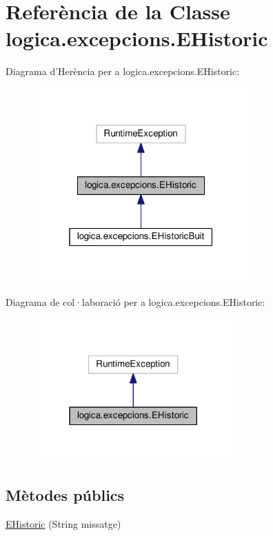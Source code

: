 \hypertarget{classlogica_1_1excepcions_1_1_e_historic}{\section{Referència de la Classe logica.\+excepcions.\+E\+Historic}
\label{classlogica_1_1excepcions_1_1_e_historic}
}


Diagrama d'Herència per a logica.\+excepcions.\+E\+Historic\+:
\nopagebreak
\begin{figure}[H]
\begin{center}
\leavevmode
\includegraphics[width=235pt]{classlogica_1_1excepcions_1_1_e_historic__inherit__graph}
\end{center}
\end{figure}


Diagrama de col·laboració per a logica.\+excepcions.\+E\+Historic\+:
\nopagebreak
\begin{figure}[H]
\begin{center}
\leavevmode
\includegraphics[width=218pt]{classlogica_1_1excepcions_1_1_e_historic__coll__graph}
\end{center}
\end{figure}
\subsection*{Mètodes públics}
\begin{DoxyCompactItemize}
\item 
\hyperlink{classlogica_1_1excepcions_1_1_e_historic_acab5c3f0a9627e9d9d228e34922dcb2b}{E\+Historic} (String missatge)
\end{DoxyCompactItemize}


